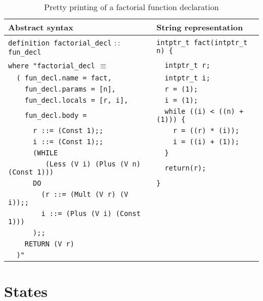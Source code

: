 \begin{table}[h!]
\centering
\begin{tabular}{|l|l|}
  \hline
  \textbf{Abstract syntax} & \textbf{String representation} \\ [0.5ex]
  \hline \hline
  \verb|definition factorial_decl| $::$ \verb|fun_decl|  & \verb|intptr_t fact(intptr_t n) {| \\
  \verb|where "factorial_decl| $\equiv$                  & \verb|  intptr_t r;| \\
  \verb|  ( fun_decl.name = fact,|                       & \verb|  intptr_t i;| \\
  \verb|    fun_decl.params = [n],|                      & \verb|  r = (1);| \\
  \verb|    fun_decl.locals = [r, i],|                   & \verb|  i = (1);| \\
  \verb|    fun_decl.body =|                             & \verb|  while ((i) < ((n) + (1))) {| \\
  \verb|      r ::= (Const 1);;|                         & \verb|    r = ((r) * (i));| \\
  \verb|      i ::= (Const 1);;|                         & \verb|    i = ((i) + (1));| \\
  \verb|      (WHILE|                                    & \verb|  }| \\
  \verb|         (Less (V i) (Plus (V n) (Const 1)))|    & \verb|  return(r);| \\
  \verb|      DO|                                        & \verb|}| \\
  \verb|        (r ::= (Mult (V r) (V i));;|             & \\
  \verb|        i ::= (Plus (V i) (Const 1)))|           & \\
  \verb|      );;|                                       & \\
  \verb|    RETURN (V r)|                                & \\
  \verb|  )"|                                            & \\
  \hline
\end{tabular}

\caption{Pretty printing of a factorial function declaration}
\label{tab:pretty_function_fact}
\end{table}


\section{States}

